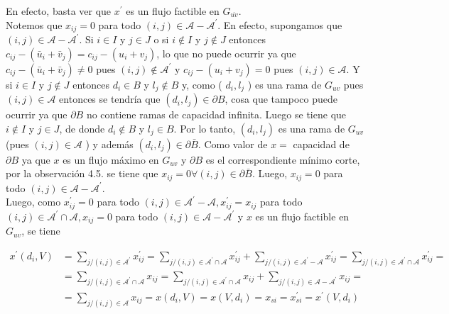 \documentclass[10pt]{article}
\begin{document}
En efecto, basta ver que $x^{\prime}$ es un flujo factible en $G_{\overline{u v}}$.\\
Notemos que $x_{i j}=0$ para todo $(i, j) \in \mathcal{A}-\mathcal{A}^{\prime}$. En efecto, supongamos que $(i, j) \in \mathcal{A}-\mathcal{A}^{\prime}$. Si $i \in I$ y $j \in J$ o si $i \notin I$ y $j \notin J$ entonces $c_{i j}-\left(\bar{u}_{i}+\bar{v}_{j}\right)=c_{i j}-\left(u_{i}+v_{j}\right)$, lo que no puede ocurrir ya que $c_{i j}-\left(\bar{u}_{i}+\bar{v}_{j}\right) \neq 0$ pues $(i, j) \notin \mathcal{A}^{\prime}$ y $c_{i j}-\left(u_{i}+v_{j}\right)=0$ pues $(i, j) \in \mathcal{A}$. Y si $i \in I$ y $j \notin J$ entonces $d_{i} \in B$ y $l_{j} \notin B$ y, como ( $d_{i}, l_{j}$ ) es una rama de $G_{u v}$ pues $(i, j) \in \mathcal{A}$ entonces se tendría que $\left(d_{i}, l_{j}\right) \in \partial B$, cosa que tampoco puede ocurrir ya que $\partial B$ no contiene ramas de capacidad infinita. Luego se tiene que $i \notin I$ y $j \in J$, de donde $d_{i} \notin B$ y $l_{j} \in B$. Por lo tanto, $\left(d_{i}, l_{j}\right)$ es una rama de $G_{u v}$ (pues $(i, j) \in \mathcal{A}$ ) y además $\left(d_{i}, l_{j}\right) \in \partial \bar{B}$. Como valor de $x=$ capacidad de $\partial B$ ya que $x$ es un flujo máximo en $G_{u v}$ y $\partial B$ es el correspondiente mínimo corte, por la observación 4.5. se tiene que $x_{i j}=0 \forall(i, j) \in \partial \bar{B}$. Luego, $x_{i j}=0$ para todo $(i, j) \in \mathcal{A}-\mathcal{A}^{\prime}$.\\
Luego, como $x_{i j}^{\prime}=0$ para todo $(i, j) \in \mathcal{A}^{\prime}-\mathcal{A}, x_{i j}^{\prime}=x_{i j}$ para todo $(i, j) \in \mathcal{A}^{\prime} \cap \mathcal{A}, x_{i j}=0$ para todo $(i, j) \in \mathcal{A}-\mathcal{A}^{\prime}$ y $x$ es un flujo factible en $G_{u v}$, se tiene

$$
\begin{aligned}
x^{\prime}\left(d_{i}, V\right) & =\sum_{j /(i, j) \in \mathcal{A}^{\prime}} x_{i j}^{\prime}=\sum_{j /(i, j) \in \mathcal{A}^{\prime} \cap \mathcal{A}} x_{i j}^{\prime}+\sum_{j /(i, j) \in \mathcal{A}^{\prime}-\mathcal{A}} x_{i j}^{\prime}=\sum_{j /(i, j) \in \mathcal{A}^{\prime} \cap \mathcal{A}} x_{i j}^{\prime}= \\
& =\sum_{j /(i, j) \in \mathcal{A}^{\prime} \cap \mathcal{A}} x_{i j}=\sum_{j /(i, j) \in \mathcal{A}^{\prime} \cap \mathcal{A}} x_{i j}+\sum_{j /(i, j) \in \mathcal{A}-\mathcal{A}^{\prime}} x_{i j}= \\
& =\sum_{j /(i, j) \in \mathcal{A}} x_{i j}=x\left(d_{i}, V\right)=x\left(V, d_{i}\right)=x_{s i}=x_{s i}^{\prime}=x^{\prime}\left(V, d_{i}\right)
\end{aligned}
$$
\end{document}

